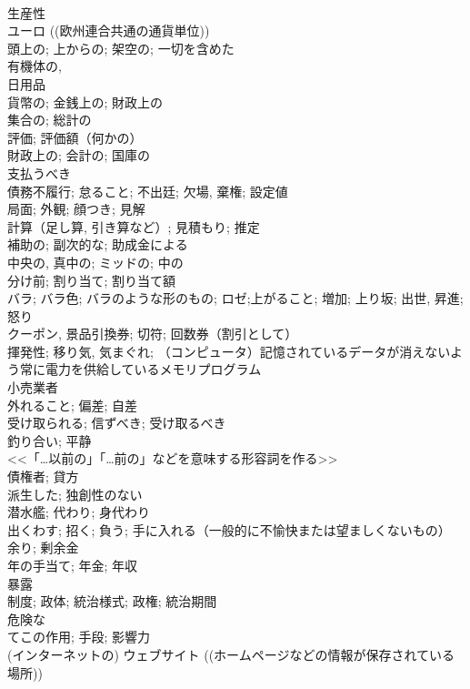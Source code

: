 \documentclass[8pt]{extreport}
\begin{document}
\begin{CJK}{UTF8}{min}
\\	生産性	
\\	ユーロ ((欧州連合共通の通貨単位))	
\\	頭上の; 上からの; 架空の; 一切を含めた	
\\	有機体の,
\\	日用品	
\\	貨幣の; 金銭上の; 財政上の	
\\	集合の; 総計の	
\\	評価; 評価額（何かの）	
\\	財政上の; 会計の; 国庫の	
\\	支払うべき	
\\	債務不履行; 怠ること; 不出廷; 欠場, 棄権; 設定値	
\\	局面; 外観; 顔つき; 見解	
\\	計算（足し算, 引き算など）; 見積もり; 推定	
\\	補助の; 副次的な; 助成金による	
\\	中央の, 真中の; ミッドの; 中の	
\\	分け前; 割り当て; 割り当て額	
\\	バラ; バラ色; バラのような形のもの; ロゼ;上がること; 増加; 上り坂; 出世, 昇進; 怒り	
\\	クーポン, 景品引換券; 切符; 回数券（割引として）	
\\	揮発性; 移り気, 気まぐれ; （コンピュータ）記憶されているデータが消えないよう常に電力を供給しているメモリプログラム	
\\	小売業者	
\\	外れること; 偏差; 自差	
\\	受け取られる; 信ずべき; 受け取るべき	
\\	釣り合い; 平静	
\\	<<「…以前の」「…前の」などを意味する形容詞を作る>>	
\\	債権者; 貸方	
\\	派生した; 独創性のない	
\\	潜水艦; 代わり; 身代わり	
\\	出くわす; 招く; 負う; 手に入れる（一般的に不愉快または望ましくないもの）	
\\	余り; 剰余金	
\\	年の手当て; 年金; 年収	
\\	暴露	
\\	制度; 政体; 統治様式; 政権; 統治期間	
\\	危険な	
\\	てこの作用; 手段; 影響力	
\\	(インターネットの) ウェブサイト ((ホームページなどの情報が保存されている場所))	

\end{CJK}
\end{document}
